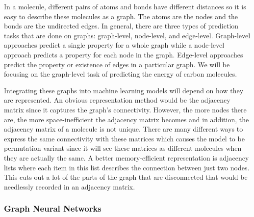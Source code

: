 \documentclass[12pt, abstract = true]{scrartcl}
\begin{document}
In a molecule, different pairs of atoms and bonds have different distances so it is easy to describe
these molecules as a graph. The atoms are the nodes and the bonds are the undirected edges. In general, 
there are three types of prediction tasks that are done on graphs: graph-level, node-level, and edge-level. 
Graph-level approaches predict a single property for a whole graph while a node-level approach predicts 
a property for each node in the graph. Edge-level approaches predict the property or existence of edges 
in a particular graph. We will be focusing on the graph-level task of predicting the energy of carbon 
molecules. 

Integrating these graphs into machine learning models will depend on how they are represented. 
An obvious representation method would be the adjacency matrix since it captures the graph's connectivity. 
However, the more nodes there are, the more space-inefficient the adjacency matrix becomes and in addition,
the adjacency matrix of a molecule is not unique. There are many different ways to express the same 
connectivity with these matrices which causes the model to be permutation variant since it will see 
these matrices as different molecules when they are actually the same. A better memory-efficient representation 
is adjacency lists where each item in this list describes the connection between just two nodes. This cuts out 
a lot of the parts of the graph that are disconnected that would be needlessly recorded in an adjacency matrix.


\subsubsection{Graph Neural Networks}    
\end{document}
